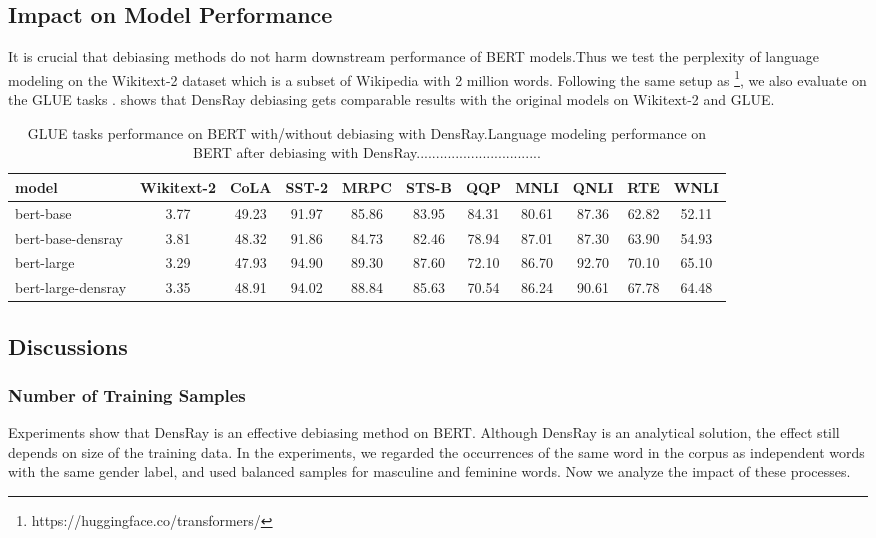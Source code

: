 \subsection{Impact on Model Performance}
It is crucial that debiasing methods do not harm downstream performance of BERT models.Thus we test the perplexity of language modeling on the Wikitext-2 dataset \citep{merity2016pointer} which is a subset of Wikipedia with 2 million words. Following the same setup as \citet{wolf2019huggingfaces}\footnote{https://huggingface.co/transformers/}, we also evaluate on the GLUE tasks \citep{wang2018glue}.  shows that DensRay debiasing gets comparable results with the original models on Wikitext-2 and GLUE.
\begin{table}[ht]
\centering
\footnotesize
\begin{tabular}{lcccccccccc}
\hline
model & Wikitext-2&CoLA &SST-2&MRPC&STS-B&QQP&MNLI&QNLI&RTE&WNLI\\
\hline
bert-base &3.77& 49.23& 91.97&85.86 & 83.95& 84.31& 80.61& 87.36& 62.82& 52.11\\
bert-base-densray &3.81& 48.32& 91.86& 84.73& 82.46& 78.94& 87.01& 87.30& 63.90& 54.93\\
\hline
bert-large &3.29& 47.93&94.90&89.30&87.60&72.10&86.70&92.70&70.10&65.10\\
bert-large-densray &3.35& 48.91&94.02&88.84&85.63&70.54&86.24&90.61&67.78&64.48\\
\hline
\end{tabular}
\caption{
GLUE tasks performance on BERT with/without debiasing with DensRay.Language modeling performance on BERT after debiasing with DensRay................................}
\end{table}
\subsection{Discussions}
\subsubsection{Number of Training Samples}
Experiments show that DensRay is an effective debiasing method on BERT. Although DensRay is an analytical solution, the effect still depends on size of the training data. In the experiments, we regarded the occurrences of the same word in the corpus as independent words with the same gender label, and used balanced samples for masculine and feminine words. Now we analyze the impact of these processes.

